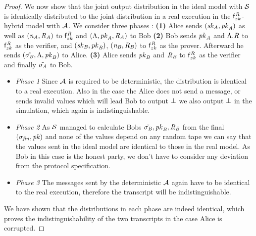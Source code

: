 \begin{proof}
    We now show that the joint output distribution in the ideal model with $\mathcal{S}$ is identically distributed to the joint distribution in a real execution in the $\mathsf{f}^{\mathit{R}}_{zk}$-hybrid model with $\mathcal{A}$.
    We consider three phases :
    \textbf{(1)} Alice sends $(\mathit{sk}_{\mathit{A}}, \mathit{pk}_{\mathit{A}})$ as well as $(\mathit{\mathit{n}_{\mathit{A}}}, \mathit{R}_{\mathit{A}})$ to $\mathsf{f}^{\mathit{R}}_{zk}$ and $(\Lambda, \mathit{pk}_{\mathit{A}}, \mathit{R}_{\mathit{A}})$ to Bob
    \textbf{(2)} Bob sends $\mathit{pk}_{\mathit{A}}$ and $\Lambda.\mathit{R}$ to $\mathsf{f}^{\mathit{R}}_{zk}$ as the verifier, and  $(\mathit{sk}_{\mathit{B}}, \mathit{pk}_{\mathit{B}})$, $(\mathit{\mathit{n}_{\mathit{B}}}, \mathit{R}_{\mathit{B}})$ to $\mathsf{f}^{\mathit{R}}_{zk}$ as the prover.
    Afterward he sends $(\tilde{\sigma_{\mathit{B}}}, \Lambda, \mathit{pk}_{\mathit{B}})$ to Alice.
    \textbf{(3)} Alice sends $\mathit{pk}_{\mathit{B}}$ and $\mathit{R}_{\mathit{B}}$ to $\mathsf{f}^{\mathit{R}}_{zk}$ as the verifier and finally $\tilde{\sigma_{\mathit{A}}}$ to Bob.

    \begin{itemize}
        \item \textit{Phase 1} Since $\mathcal{A}$ is required to be deterministic, the distribution is identical to a real execution.
        Also in the case the Alice does not send a message, or sends invalid values which will lead Bob to output $\bot$ we also output $\bot$ in the simulation, which again is indistinguishable.
        \item \textit{Phase 2} As $\mathcal{S}$ managed to calculate Bobs $\tilde{\sigma_{\mathit{B}}}, \mathit{pk}_{\mathit{B}}, \mathit{R}_{\mathit{B}}$ from the final $(\sigma_{\mathit{fin}}, \mathit{pk})$ and none of the values depend on any random tape we can say that the values sent in the ideal model are identical to those in the real model.
        As Bob in this case is the honest party, we don't have to consider any deviation from the protocol specification.
        \item \textit{Phase 3} The messages sent by the deterministic $\mathcal{A}$ again have to be identical to the real execution, therefore the transcript will be indistinguishable.
    \end{itemize}

    We have shown that the distributions in each phase are indeed identical, which proves the indistinguishability of the two transcripts in the case Alice is corrupted.
    

\end{proof}
